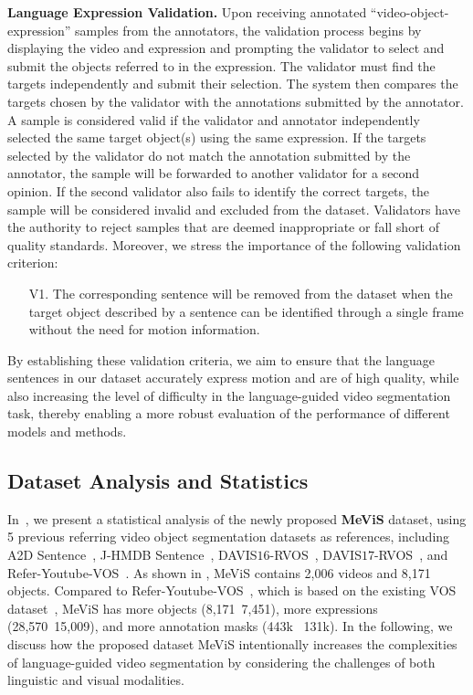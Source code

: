 \documentclass[10pt,twocolumn,letterpaper]{article}
\newcommand{\myparagraph}[1]{{\vspace{.5em} \noindent \bf #1}}
\newcommand{\numvideo}{2,006\xspace}
\newcommand{\numobject}{8,171\xspace}
\newcommand{\numsentence}{28,570\xspace}
\newcommand{\ourdataset}{MeViS\xspace}
\begin{document}
\vspace{-3.6mm}
\myparagraph{Language Expression Validation.} 
Upon receiving annotated ``video-object-expression'' samples from the annotators, the validation process begins by displaying the video and expression and prompting the validator to select and submit the objects referred to in the expression. The validator must find the targets independently and submit their selection. The system then compares the targets chosen by the validator with the annotations submitted by the annotator. A sample is considered valid if the validator and annotator independently selected the same target object(s) using the same expression. If the targets selected by the validator do not match the annotation submitted by the annotator, the sample will be forwarded to another validator for a second opinion. If the second validator also fails to identify the correct targets, the sample will be considered invalid and excluded from the dataset. Validators have the authority to reject samples that are deemed inappropriate or fall short of quality standards. Moreover, we stress the importance of the following validation criterion:
\begin{itemize}
\vspace{-1.6mm}
\item[V1.] The corresponding sentence will be removed from the dataset when the target object described by a sentence can be identified through a single frame without the need for motion information.
\vspace{-1.6mm}
\end{itemize}
By establishing these validation criteria, we aim to ensure that the language sentences in our dataset accurately express motion and are of high quality, while also increasing the level of difficulty in the language-guided video segmentation task, thereby enabling a more robust evaluation of the performance of different models and methods.


\subsection{Dataset Analysis and Statistics}\label{sec:datasetStatistics}

In~, we present a statistical analysis of the newly proposed \textbf{\ourdataset} dataset, using 5 previous referring video object segmentation datasets as references, including A2D Sentence~\cite{gavrilyuk2018actor}, J-HMDB Sentence~\cite{gavrilyuk2018actor}, DAVIS${16}$-RVOS~\cite{khoreva2018video}, DAVIS${17}$-RVOS~\cite{khoreva2018video}, and Refer-Youtube-VOS~\cite{seo2020urvos}. As shown in , \ourdataset contains \numvideo videos and \numobject objects. Compared to Refer-Youtube-VOS~\cite{seo2020urvos}, which is based on the existing VOS dataset~\cite{xu2018youtube}, \ourdataset has more objects (\numobject \vs~7,451), more expressions (\numsentence \vs~15,009), and more annotation masks (443k \vs~131k). In the following, we discuss how the proposed dataset \ourdataset intentionally increases the complexities of language-guided video segmentation by considering the challenges of both linguistic and visual modalities.
\end{document}
